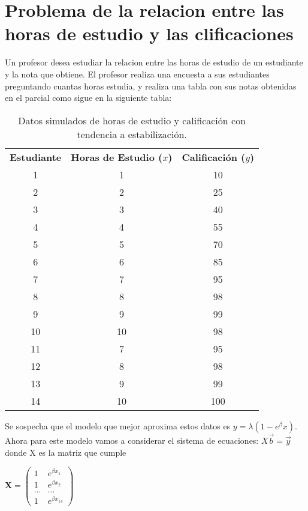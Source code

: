 \documentclass{article}
\begin{document}
\section{Problema de la relacion entre las horas de estudio y las clificaciones}

Un profesor desea estudiar la relacion entre las horas de estudio de un estudiante y la nota que obtiene. El profesor
realiza una encuesta a sus estudiantes preguntando cuantas horas estudia, y realiza una tabla con sus notas obtenidas 
en el parcial como sigue en la siguiente tabla:
\begin{table}[h!]
    \centering
    \begin{tabular}{|c|c|c|}
    \hline
    \textbf{Estudiante} & \textbf{Horas de Estudio (\(x\))} & \textbf{Calificación (\(y\))} \\
    1  & 1  & 10   \\ \hline 
    2  & 2  & 25   \\ \hline
    3  & 3  & 40   \\ \hline
    4  & 4  & 55   \\ \hline
    5  & 5  & 70   \\ \hline
    6  & 6  & 85   \\ \hline
    7  & 7  & 95   \\ \hline
    8  & 8  & 98   \\ \hline
    9  & 9  & 99   \\ \hline
    10 & 10 & 98  \\ \hline
    11  & 7  & 95   \\ \hline
    12  & 8  & 98   \\ \hline
    13  & 9  & 99   \\ \hline
    14 & 10 & 100  \\ \hline
    \end{tabular}
    \caption{Datos simulados de horas de estudio y calificación con tendencia a estabilización.}
    \label{tabla:horas_estudio_aplanada}
\end{table}

Se sospecha que el modelo que mejor aproxima estos datos es $y = \lambda(1-e^\beta x)$. Ahora para este modelo vamos a 
considerar el sistema de ecuaciones: $X\vec{b} = \vec{y}$ donde X es la matriz que cumple
\begin{center}
$ \mathbf{X} = \begin{pmatrix} 1 & e^{\beta x_1} \\ 1 & e^{\beta x_2} \\ ... & ... \\ 1 & e^{\beta x_14} \end{pmatrix} $  
\end{center}
\end{document}
